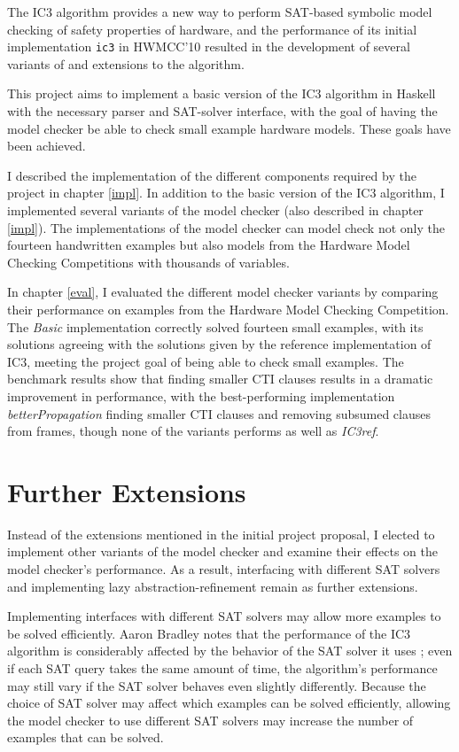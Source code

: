 \documentclass[12pt,a4paper,twoside,openright]{report}
\begin{document}
{The IC3 algorithm provides a new way to perform SAT-based symbolic model checking of
safety properties of hardware, and the performance of its initial implementation
\verb,ic3, in HWMCC'10 resulted in the development of several variants of
and extensions to the algorithm.

This project aims to implement a basic version of the IC3 algorithm in Haskell with the
necessary parser and SAT-solver interface, with the goal of having the model checker
be able to check small example hardware models. These goals have been achieved.

I described the implementation of the different components required by
the project in chapter \ref{impl}.
In addition to the basic version of the IC3 algorithm, I implemented several variants of the model checker (also described in chapter \ref{impl}).
The implementations of the model checker can model check not only
the fourteen handwritten examples but also models from the
Hardware Model Checking Competitions with thousands of variables.

In chapter \ref{eval}, I evaluated the different model checker variants by comparing their performance on examples from
the Hardware Model Checking Competition.
The \emph{Basic} implementation correctly
solved fourteen small examples, with its solutions agreeing with the solutions given by
the reference implementation of IC3, meeting the project goal of being able to check
small examples.
The benchmark results show that finding smaller CTI clauses
results in a dramatic improvement in performance, with the best-performing implementation
\emph{betterPropagation} finding smaller CTI clauses and removing subsumed clauses from frames,
though none of the variants performs as well as \emph{IC3ref}.

\section{Further Extensions}
\label{conc:extensions}

Instead of the extensions mentioned in the initial project proposal,
I elected to implement other variants of the model checker and examine their
effects on the model checker's performance.
As a result, interfacing with different SAT solvers and implementing lazy
abstraction-refinement remain as further extensions.

Implementing interfaces with different SAT solvers may allow more examples to be solved efficiently.
Aaron Bradley notes that the performance of the IC3 algorithm is considerably affected
by the behavior of the SAT solver it uses \cite{bradley12}; even if each SAT query takes the same amount of
time, the algorithm's performance may still vary if the SAT solver behaves even slightly differently.
Because the choice of SAT solver may affect which examples can be solved efficiently, allowing the model
checker to use different SAT solvers may increase the number of examples that can be solved.

}
\end{document}
